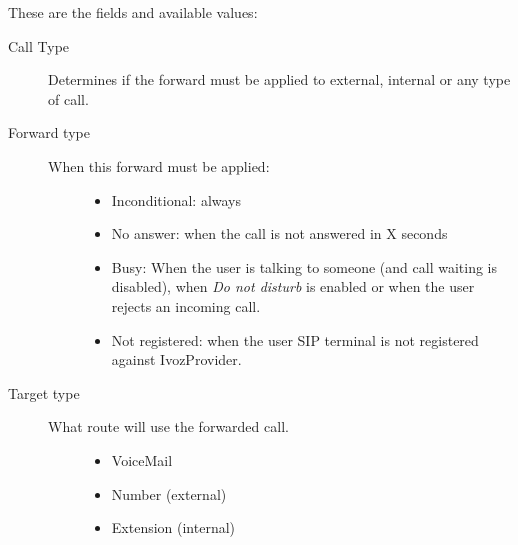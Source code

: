 \documentclass[letterpaper,10pt,english]{sphinxmanual}
\begin{document}
These are the fields and available values:
\begin{description}
\item[{Call Type}] \leavevmode{}\label{pbx_features/users:term-call-type}
Determines if the forward must be applied to external, internal or any
type of call.

\item[{Forward type}] \leavevmode{}\label{pbx_features/users:term-forward-type}\begin{description}
\item[{When this forward must be applied:}] \leavevmode\begin{itemize}
\item {} 
Inconditional: always

\item {} 
No answer: when the call is not answered in X seconds

\item {} 
Busy: When the user is talking to someone (and call waiting is
disabled), when \emph{Do not disturb} is enabled or when the user
rejects an incoming call.

\item {} 
Not registered: when the user SIP terminal is not registered
against IvozProvider.

\end{itemize}

\end{description}

\item[{Target type}] \leavevmode{}\label{pbx_features/users:term-target-type}\begin{description}
\item[{What route will use the forwarded call.}] \leavevmode\begin{itemize}
\item {} 
VoiceMail

\item {} 
Number (external)

\item {} 
Extension (internal)

\end{itemize}

\end{description}

\end{description}
\end{document}
